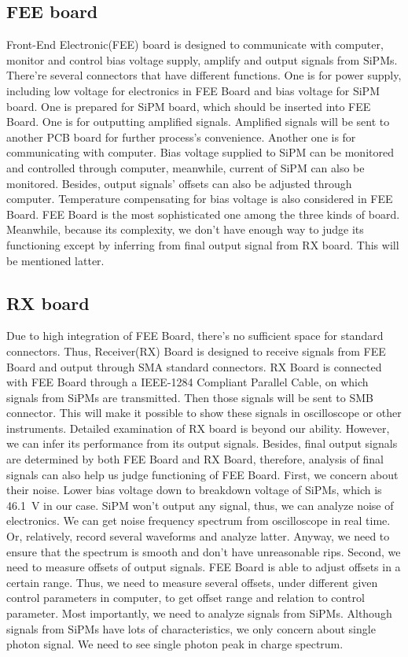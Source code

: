 \documentclass[11pt,a4paper]{article}
\begin{document}
\subsection{FEE board}
Front-End Electronic(FEE) board is designed to communicate with computer,
monitor and control bias voltage supply, amplify and output signals from SiPMs.
There’re several connectors that have different functions. One is for power supply, including low voltage for electronics in FEE Board and bias voltage for SiPM board. One is prepared for SiPM board, which should be inserted into FEE Board. One is for outputting amplified signals. Amplified signals will be sent to another PCB board for further process's convenience. Another one is for communicating with computer. Bias voltage supplied to SiPM can be monitored and controlled through computer, meanwhile, current of SiPM can also be monitored. Besides, output signals’ offsets can also be adjusted through computer. Temperature compensating for bias voltage is also considered in FEE Board.
FEE Board is the most sophisticated one among the three kinds of board. Meanwhile, because its complexity, we don't have enough way to judge its functioning except by inferring from final output signal from RX board. This will be mentioned latter.
\subsection{RX board}
Due to high integration of FEE Board, there's no sufficient space for standard
connectors. Thus, Receiver(RX) Board is designed to receive signals from FEE Board and output through SMA standard connectors. RX Board is connected with FEE Board through a IEEE-1284 Compliant Parallel Cable, on which signals from SiPMs are transmitted. Then those signals will be sent to SMB connector. This will make it possible to show these signals in oscilloscope or other instruments. Detailed examination of RX board is beyond our ability. However, we can infer its
performance from its output signals. Besides, final output signals are determined by both FEE Board and RX Board, therefore, analysis of final signals can also help us judge functioning of FEE Board.
First, we concern about their noise. Lower bias voltage down to breakdown voltage of SiPMs, which is 46.1~V in our case. SiPM won't output any signal, thus, we can analyze noise of electronics. We can get noise frequency spectrum from oscilloscope in real time. Or, relatively, record several waveforms and analyze latter. Anyway, we need to ensure that the spectrum is smooth and don't have unreasonable rips.
Second, we need to measure offsets of output signals. FEE Board is able to adjust offsets in a certain range. Thus, we need to measure several offsets, under different given control parameters in computer, to get offset range and relation to control parameter.
Most importantly, we need to analyze signals from SiPMs. Although signals from SiPMs have lots of characteristics, we only concern about single photon signal. We need to see single photon peak in charge spectrum.
\end{document}
